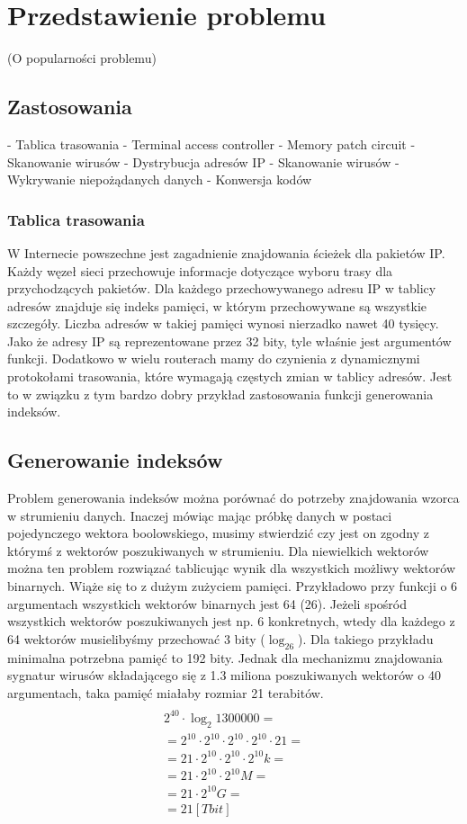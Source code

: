 \chapter{Przedstawienie problemu}
(O popularności problemu)

\section{Zastosowania}
- Tablica trasowania
- Terminal access controller
- Memory patch circuit
- Skanowanie wirusów
- Dystrybucja adresów IP
- Skanowanie wirusów
- Wykrywanie niepożądanych danych
- Konwersja kodów

\subsection{Tablica trasowania}
W Internecie powszechne jest zagadnienie znajdowania ścieżek dla pakietów IP.
Każdy węzeł sieci przechowuje informacje dotyczące wyboru trasy dla przychodzących pakietów.
Dla każdego przechowywanego adresu IP w tablicy adresów znajduje się indeks pamięci, w którym przechowywane są wszystkie szczegóły.
Liczba adresów w takiej pamięci wynosi nierzadko nawet 40 tysięcy.
Jako że adresy IP są reprezentowane przez 32 bity, tyle właśnie jest argumentów funkcji.
Dodatkowo w wielu routerach mamy do czynienia z dynamicznymi protokołami trasowania, które wymagają częstych zmian w tablicy adresów.
Jest to w związku z tym bardzo dobry przykład zastosowania funkcji generowania indeksów.

\section{Generowanie indeksów}

Problem generowania indeksów można porównać do potrzeby znajdowania wzorca w strumieniu danych.
Inaczej mówiąc mając próbkę danych w postaci pojedynczego wektora boolowskiego, musimy stwierdzić czy jest on zgodny z którymś z wektorów poszukiwanych w strumieniu.
Dla niewielkich wektorów można ten problem rozwiązać tablicując wynik dla wszystkich możliwy wektorów binarnych.
Wiąże się to z dużym zużyciem pamięci.
Przykładowo przy funkcji o 6 argumentach wszystkich wektorów binarnych jest 64 (26).
Jeżeli spośród wszystkich wektorów poszukiwanych jest np. 6 konkretnych, wtedy dla każdego z 64 wektorów musielibyśmy przechować 3 bity ($\log_26$).
Dla takiego przykładu minimalna potrzebna pamięć to 192 bity.
Jednak dla mechanizmu znajdowania sygnatur wirusów składającego się z 1.3 miliona poszukiwanych wektorów o 40 argumentach, taka pamięć miałaby rozmiar 21 terabitów.
\begin{multline} \\
2^{40} \cdot \log_2 1300000 = \\
= 2^{10} \cdot 2^{10} \cdot 2^{10} \cdot 2^{10} \cdot 21 = \\
=21 \cdot 2^{10} \cdot 2^{10} \cdot 2^{10} k = \\
=21 \cdot 2^{10} \cdot 2^{10} M = \\
=21 \cdot 2^{10} G = \\
=21 [Tbit] \\
\end{multline}

